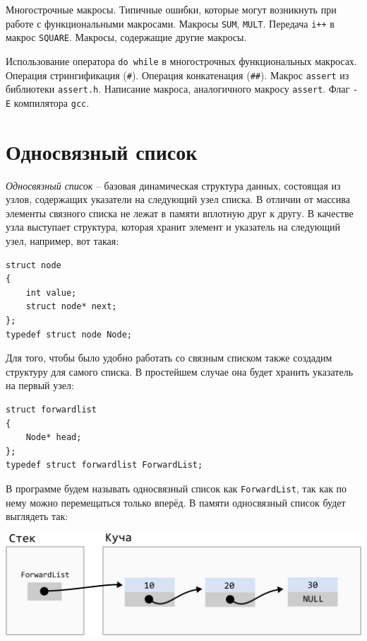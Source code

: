 \documentclass{article}
\begin{document}
Многострочные макросы. Типичные ошибки, которые
могут возникнуть при работе с функциональными макросами. 
Макросы \texttt{SUM}, \texttt{MULT}. Передача \texttt{i++} в макрос \texttt{SQUARE}.
Макросы, содержащие другие макросы.

Использование оператора \texttt{do while} в
многострочных функциональных макросах. Операция стрингификация (\texttt{\#}). Операция конкатенация (\texttt{\#\#}).
Макрос \texttt{assert} из библиотеки \texttt{assert.h}. Написание макроса, аналогичного макросу \texttt{assert}. Флаг \texttt{-E} компилятора \texttt{gcc}.

\newpage
\section*{Односвязный список}

\textit{Односвязный список} -- базовая динамическая структура данных, состоящая из узлов, содержащих указатели на следующий узел списка. В отличии от массива элементы связного списка не лежат в памяти вплотную друг к другу. В качестве узла выступает структура, которая хранит элемент и указатель на следующий узел, например, вот такая:
\begin{lstlisting}
struct node 
{
    int value;
    struct node* next;
};
typedef struct node Node;
\end{lstlisting}

Для того, чтобы было удобно работать со связным списком также создадим структуру для самого списка. В простейшем случае она будет хранить указатель на первый узел:
\begin{lstlisting}
struct forwardlist 
{
    Node* head;
};
typedef struct forwardlist ForwardList;
\end{lstlisting}

В программе будем называть односвязный список как \texttt{ForwardList}, так как по нему можно перемещаться только вперёд. В памяти односвязный список будет выглядеть так:
\begin{center}
\includegraphics[scale=0.85]{../images/forward_list.png}
\end{center}
\end{document}
